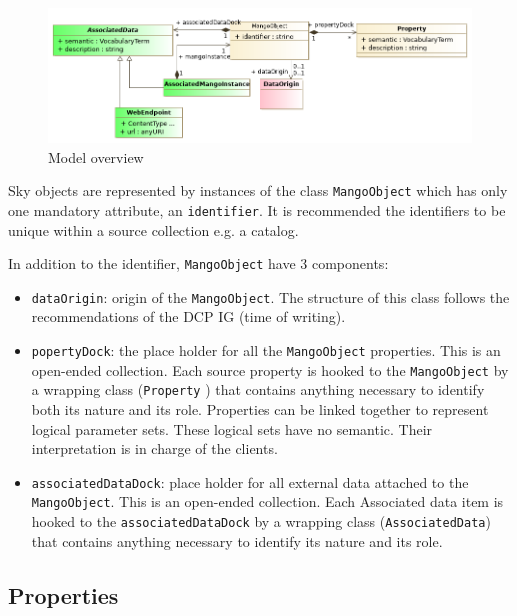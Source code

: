 \documentclass[11pt,a4paper]{ivoa}
\begin{document}
\begin{figure}
     \includegraphics[width=1.0\textwidth]{../model/overview.png}
     \caption{Model overview}
     \label{overview}
\end{figure}

Sky objects are represented by instances of the class \texttt{MangoObject} which has only
one mandatory attribute, an \texttt{identifier}.
It is recommended the identifiers to be unique within a source collection e.g. a catalog.

In addition to the identifier, \texttt{MangoObject}  have 3 components:

\begin{itemize}
  \item \texttt{dataOrigin}: origin of the \texttt{MangoObject}. The structure of this class follows
        the recommendations of the DCP IG (time of writing).
  \item \texttt{popertyDock}: the place holder for all the \texttt{MangoObject} properties.
        This is an open-ended collection.
        Each source property is hooked to the \texttt{MangoObject} by a wrapping class (\texttt{Property} )
        that contains anything necessary to identify both its nature and its role.
        Properties can be linked together to represent logical parameter sets. 
        These logical sets have no semantic. Their interpretation is in charge of the clients.
  \item \texttt{associatedDataDock}: place holder for all external data attached to the \texttt{MangoObject}.
        This is an open-ended collection.
  		Each Associated data item is hooked to the \texttt{associatedDataDock} by a wrapping class (\texttt{AssociatedData})
        that contains anything necessary to identify its nature and its role.
\end{itemize}
\subsection{Properties}
\end{document}
